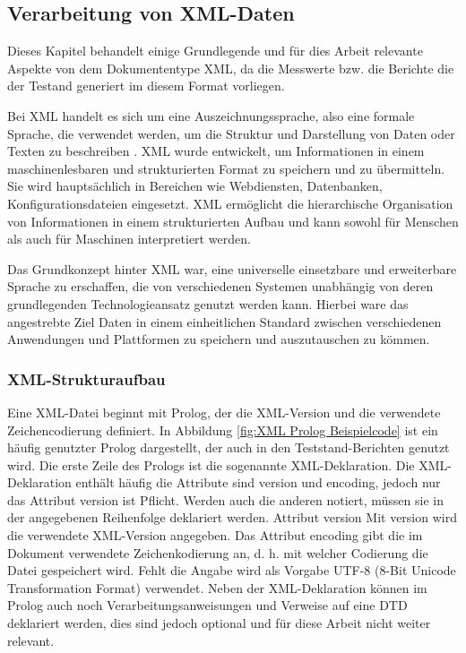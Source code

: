 \subsection{Verarbeitung von XML-Daten}
\label{subsec:verarbeitung-von-xml-daten}
Dieses Kapitel behandelt einige Grundlegende und für dies Arbeit relevante Aspekte von dem Dokumententype \ac{XML},
da die Messwerte bzw. die Berichte die der Testand generiert im diesem Format vorliegen.


Bei \ac{XML} handelt es sich um eine Auszeichnungssprache, also eine
formale Sprache, die verwendet werden, um die Struktur und Darstellung von Daten oder Texten zu beschreiben \cite*{Neumann2019}.
\ac{XML} wurde entwickelt, um Informationen in einem maschinenlesbaren und strukturierten Format zu speichern und zu übermitteln.
Sie wird hauptsächlich in Bereichen wie Webdiensten, Datenbanken, Konfigurationsdateien eingesetzt.
\ac{XML} ermöglicht die hierarchische Organisation von Informationen in einem strukturierten Aufbau und kann sowohl für Menschen
als auch für Maschinen interpretiert werden.\cite*[4]{PeterBrezany2003}

Das Grundkonzept hinter \ac{XML} war, eine universelle einsetzbare und erweiterbare Sprache zu erschaffen, die von verschiedenen Systemen
unabhängig von deren grundlegenden Technologieansatz genutzt werden kann.
Hierbei ware das angestrebte Ziel Daten in einem einheitlichen Standard zwischen verschiedenen Anwendungen und Plattformen zu speichern und auszutauschen
zu kömmen.\cite*[3-5]{PeterBrezany2003}
\subsubsection{XML-Strukturaufbau}
Eine \ac{XML}-Datei beginnt mit Prolog, der die \ac{XML}-Version und die verwendete Zeichencodierung definiert.
In Abbildung \ref{fig:XML Prolog Beispielcode} ist ein häufig genutzter Prolog dargestellt, der auch in den Teststand-Berichten genutzt wird.
Die erste Zeile des Prologs ist die sogenannte \ac{XML}-Deklaration.
Die XML-Deklaration enthält häufig die Attribute sind version und encoding, jedoch nur das Attribut version ist Pflicht.
Werden auch die anderen notiert, müssen sie in der angegebenen Reihenfolge deklariert werden.
Attribut version Mit version wird die verwendete \ac{XML}-Version angegeben.
Das Attribut encoding gibt die im Dokument verwendete Zeichenkodierung an, d. h. mit welcher Codierung die Datei gespeichert wird.
Fehlt die Angabe wird als Vorgabe UTF-8 (8-Bit Unicode Transformation Format) verwendet.
Neben der \ac{XML}-Deklaration können im Prolog auch noch Verarbeitungsanweisungen und Verweise auf eine \ac{DTD} deklariert werden,
dies sind jedoch optional und für diese Arbeit nicht weiter relevant.
\cite*[8,9]{Becher2022}

